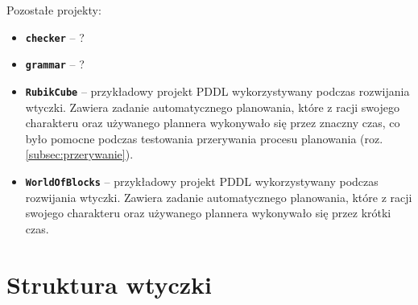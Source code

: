 Pozostałe projekty:
\begin{itemize}
\item \textbf{\texttt{checker}} -- ?
\item \textbf{\texttt{grammar}} -- ?
\item \textbf{\texttt{RubikCube}} -- przykładowy projekt PDDL wykorzystywany podczas rozwijania wtyczki. Zawiera zadanie automatycznego planowania, które z racji swojego charakteru oraz używanego plannera wykonywało się przez znaczny czas, co było pomocne podczas testowania przerywania procesu planowania (roz. \ref{subsec:przerywanie}).
\item \textbf{\texttt{WorldOfBlocks}} -- przykładowy projekt PDDL wykorzystywany podczas rozwijania wtyczki. Zawiera zadanie automatycznego planowania, które z racji swojego charakteru oraz używanego plannera wykonywało się przez krótki czas.
\end{itemize}

\section{Struktura wtyczki}
\label{sec:struktura}
